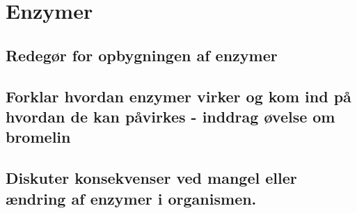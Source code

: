 \newpage
\section{Enzymer}
\subsection{Redegør for opbygningen af enzymer}
\subsection{Forklar hvordan enzymer virker og kom ind på hvordan de kan påvirkes - inddrag øvelse om bromelin}
\subsection{Diskuter konsekvenser ved mangel eller ændring af enzymer i organismen. }